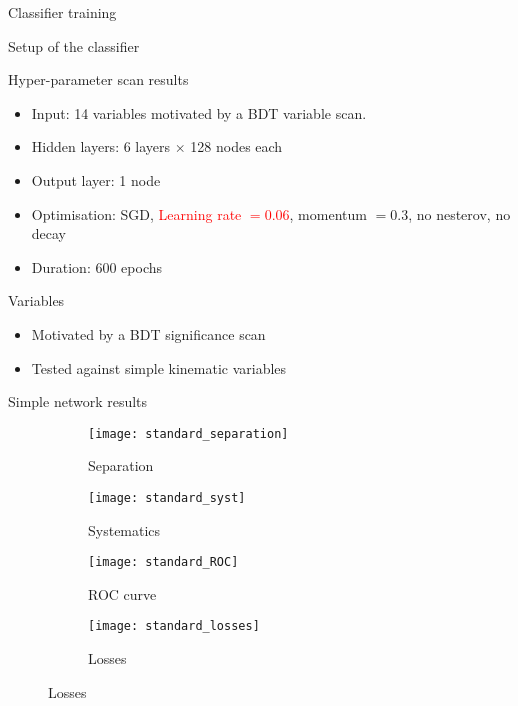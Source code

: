 \begin{frame}[c]
\begin{center}
\Huge Classifier training
\end{center}
\end{frame}

\begin{frame}{Setup of the classifier}
\begin{block}{Hyper-parameter scan results}
\begin{itemize}
\item Input: \num{14} variables motivated by a BDT variable scan.
\item Hidden layers: \num{6} \ELU layers $\times$ \num{128} nodes each
\item Output layer: \num{1} \SIGMOID node
\item Optimisation: SGD, \textcolor{red}{Learning rate $=0.06$}, momentum $=0.3$, no nesterov, no decay
\item Duration: 600 epochs
\end{itemize}
\end{block}
\begin{block}{Variables}
\begin{itemize}
    \item Motivated by a BDT significance scan
    \item Tested against simple kinematic variables
\end{itemize}
\end{block}
\end{frame}

\begin{frame}{Simple network results}
\vspace{-2mm}
\begin{figure}[htbp]
    \centering
    \begin{subfigure}[b]{0.4\textwidth}
        \texttt{[image: standard\_separation]}
        \caption{Separation}
        \label{fig:simple:final:sepa}
    \end{subfigure}
\quad
    \begin{subfigure}[b]{0.4\textwidth}
        \texttt{[image: standard\_syst]}
        \caption{Systematics}
        \label{fig:simple:final:syst}
    \end{subfigure}

    \begin{subfigure}[b]{0.4\textwidth}
		\texttt{[image: standard\_ROC]}
		\caption{ROC curve}
		\label{fig:simple:final:roc}
	\end{subfigure}
\quad
	\begin{subfigure}[b]{0.4\textwidth}
		\texttt{[image: standard\_losses]}
		\caption{Losses}
		\label{fig:simple:final:loss}
	\end{subfigure}
\end{figure}
\end{frame}